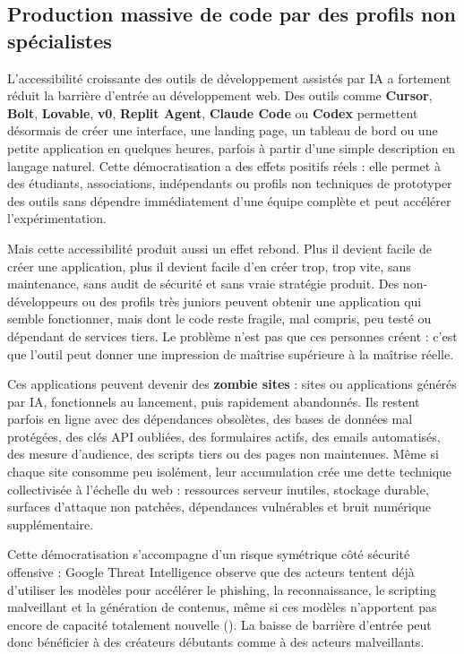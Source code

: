 \documentclass[
  10pt,
  a4paper,
  DIV=11,
  numbers=noendperiod,
  oneside]{scrreprt}
\let\oldtextbf\textbf
\renewcommand{\textbf}[1]{\oldtextbf{\textcolor{cmmnavy}{#1}}}
\begin{document}
\subsection{Production massive de code par des profils non
spécialistes}\label{production-massive-de-code-par-des-profils-non-spuxe9cialistes}

L'accessibilité croissante des outils de développement assistés par IA a
fortement réduit la barrière d'entrée au développement web. Des outils
comme \textbf{Cursor}, \textbf{Bolt}, \textbf{Lovable}, \textbf{v0},
\textbf{Replit Agent}, \textbf{Claude Code} ou \textbf{Codex} permettent
désormais de créer une interface, une landing page, un tableau de bord
ou une petite application en quelques heures, parfois à partir d'une
simple description en langage naturel. Cette démocratisation a des
effets positifs réels : elle permet à des étudiants, associations,
indépendants ou profils non techniques de prototyper des outils sans
dépendre immédiatement d'une équipe complète et peut accélérer
l'expérimentation.

Mais cette accessibilité produit aussi un effet rebond. Plus il devient
facile de créer une application, plus il devient facile d'en créer trop,
trop vite, sans maintenance, sans audit de sécurité et sans vraie
stratégie produit. Des non-développeurs ou des profils très juniors
peuvent obtenir une application qui semble fonctionner, mais dont le
code reste fragile, mal compris, peu testé ou dépendant de services
tiers. Le problème n'est pas que ces personnes créent : c'est que
l'outil peut donner une impression de maîtrise supérieure à la maîtrise
réelle.

Ces applications peuvent devenir des \textbf{zombie sites} : sites ou
applications générés par IA, fonctionnels au lancement, puis rapidement
abandonnés. Ils restent parfois en ligne avec des dépendances obsolètes,
des bases de données mal protégées, des clés API oubliées, des
formulaires actifs, des emails automatisés, des mesure d'audience, des
scripts tiers ou des pages non maintenues. Même si chaque site consomme
peu isolément, leur accumulation crée une dette technique collectivisée
à l'échelle du web : ressources serveur inutiles, stockage durable,
surfaces d'attaque non patchées, dépendances vulnérables et bruit
numérique supplémentaire.

Cette démocratisation s'accompagne d'un risque symétrique côté sécurité
offensive : Google Threat Intelligence observe que des acteurs tentent
déjà d'utiliser les modèles pour accélérer le phishing, la
reconnaissance, le scripting malveillant et la génération de contenus,
même si ces modèles n'apportent pas encore de capacité totalement
nouvelle
(). La baisse de barrière d'entrée peut donc bénéficier à des
créateurs débutants comme à des acteurs malveillants.
\end{document}
